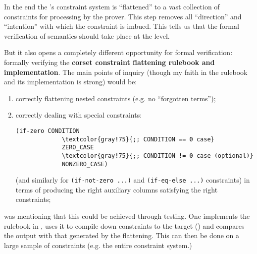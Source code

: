 In the end the \zkEvm's constraint system is ``flattened'' to a vast collection of constraints for processing by the prover. This step removes all ``direction'' and ``intention'' with which the constraint \constraintAst{} is imbued. This tells us that the formal verification of \evm{} semantics should take place at the \constraintAst{} level.

But it also opens a completely different opportunity for formal verification: formally verifying the \textbf{corset constraint flattening rulebook and implementation}. The main points of inquiry (though my faith in the rulebook and its implementation is strong) would be:
\begin{enumerate}
	\item correctly flattening nested constraints (e.g. no ``forgotten terms'');
	\item correctly dealing with special constraints:
	\begin{Verbatim}[commandchars=\\\{\}]
(if-zero CONDITION
             \textcolor{gray!75}{;; CONDITION == 0 case}
             ZERO_CASE      
             \textcolor{gray!75}{;; CONDITION != 0 case (optional)}
             NONZERO_CASE)
	\end{Verbatim}
	(and similarly for \texttt{(if-not-zero ...)} and \texttt{(if-eq-else ...)} constraints) in terms of producing the right auxiliary columns satisfying the right constraints;
\end{enumerate}
\alexV{} was mentioning that this could be achieved through testing. One implements the rulebook in \coq, uses it to compile down constraints to the target (\go) and compares the output with that generated by the \corset{} flattening. This can then be done on a large sample of constraints (e.g. the entire \zkEvm{} constraint system.)
